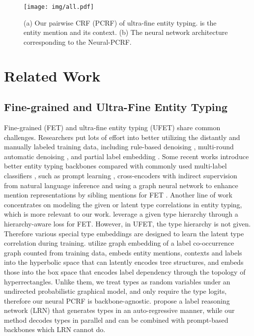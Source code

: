 \documentclass[11pt]{article}
\begin{document}
\begin{figure*}[t]
    \centering
    \texttt{[image: img/all.pdf]}
    \caption{(a) Our pairwise CRF (PCRF) of ultra-fine entity typing.  is the entity mention and its context. (b) The neural network architecture corresponding to the Neural-PCRF.}
    \label{fig:all}
\end{figure*} \section{Related Work}
\subsection{Fine-grained and Ultra-Fine Entity Typing}
Fine-grained \cite{ontonotes,figer,bbn} (FET) and ultra-fine \cite{ufet} entity typing (UFET) share common challenges. Researchers put lots of effort into better utilizing the distantly and manually labeled training data, including rule-based denoising \cite{ontonotes}, multi-round automatic denoising \cite{onoe-durrett-2019-learning,dfet,mlmet}, and partial label embedding \cite{ren2016label}. Some recent works introduce better entity typing backbones compared with commonly used multi-label classifiers \cite{ontonotes,ufet,onoe-durrett-2019-learning}, such as prompt learning \cite{ding2021prompt}, cross-encoders with indirect supervision from natural language inference \cite{lite} and using a graph neural network to enhance mention representations by sibling mentions for FET \cite{chen-etal-2022-learning-sibling}. Another line of work concentrates on modeling the given or latent type correlations in entity typing, which is more relevant to our work. \citet{ren2016label, jin-etal-2019-fine, xu-barbosa-2018-neural} leverage a given type hierarchy through a hierarchy-aware loss for FET. However, in UFET, the type hierarchy is not given. Therefore various special type embeddings are designed to learn the latent type correlation during training.
\citet{xiong-etal-2019-imposing} utilize graph embedding of a label co-occurrence graph counted from training data, \citet{lopez-strube-2020-fully} embeds entity mentions, contexts and labels into the hyperbolic space that can latently encodes tree structures, and \citet{onoe-etal-2021-modeling} embeds those into the box space that encodes label dependency through the topology of hyperrectangles. Unlike them, we treat types as random variables under an undirected probabilistic graphical model, and only require the type logits, therefore our neural PCRF is backbone-agnostic. \citet{liu-etal-2021-fine} propose a label reasoning network (LRN) that generates types in an auto-regressive manner, while our method decodes types in parallel and can be combined with prompt-based backbones which LRN cannot do.
\end{document}
